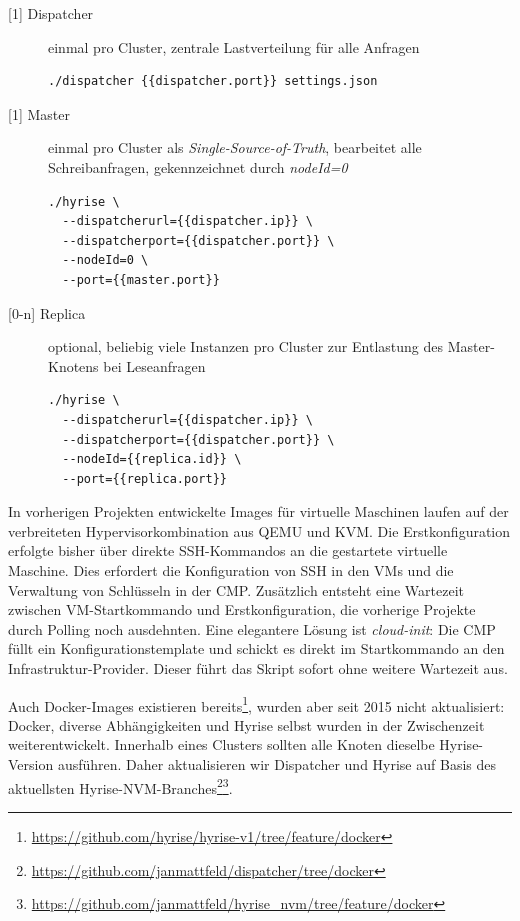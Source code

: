 \begin{description}
	
\item[{[1]} Dispatcher] einmal pro Cluster, zentrale Lastverteilung für alle Anfragen
	
\begin{verbatim}
./dispatcher {{dispatcher.port}} settings.json
\end{verbatim}
	
\item[{[1]} Master] einmal pro Cluster als \emph{Single-Source-of-Truth}, bearbeitet alle Schreibanfragen, gekennzeichnet durch \emph{nodeId=0}
	
\begin{verbatim}
./hyrise \
  --dispatcherurl={{dispatcher.ip}} \
  --dispatcherport={{dispatcher.port}} \
  --nodeId=0 \
  --port={{master.port}}
\end{verbatim}

\item[{[0-n]} Replica] optional, beliebig viele Instanzen pro Cluster zur Entlastung des Master-Knotens bei Leseanfragen

\begin{verbatim}
./hyrise \
  --dispatcherurl={{dispatcher.ip}} \
  --dispatcherport={{dispatcher.port}} \
  --nodeId={{replica.id}} \
  --port={{replica.port}}
\end{verbatim}
	
\end{description}

\noindent
In vorherigen Projekten entwickelte Images für virtuelle Maschinen laufen auf der verbreiteten Hypervisorkombination aus QEMU und KVM. Die Erstkonfiguration erfolgte bisher über direkte SSH-Kommandos an die gestartete virtuelle Maschine. Dies erfordert die Konfiguration von SSH in den VMs und die Verwaltung von Schlüsseln in der CMP. Zusätzlich entsteht eine Wartezeit zwischen VM-Startkommando und Erstkonfiguration, die vorherige Projekte durch Polling noch ausdehnten. Eine elegantere Lösung ist \emph{cloud-init}: Die CMP füllt ein Konfigurationstemplate und schickt es direkt im Startkommando an den Infrastruktur-Provider. Dieser führt das Skript sofort ohne weitere Wartezeit aus.

Auch Docker-Images existieren bereits\footnote{\url{https://github.com/hyrise/hyrise-v1/tree/feature/docker}}, wurden aber seit 2015 nicht aktualisiert: Docker, diverse Abhängigkeiten und Hyrise selbst wurden in der Zwischenzeit weiterentwickelt. Innerhalb eines Clusters sollten alle Knoten dieselbe Hyrise-Version ausführen. Daher aktualisieren wir Dispatcher und Hyrise auf Basis des aktuellsten Hyrise-NVM-Branches\footnote{\url{https://github.com/janmattfeld/dispatcher/tree/docker}}\footnote{\url{https://github.com/janmattfeld/hyrise_nvm/tree/feature/docker}}.

